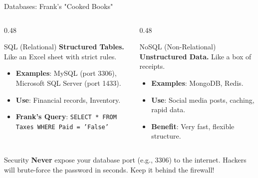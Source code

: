 \documentclass[aspectratio=169]{beamer}  %
\begin{document}
\begin{frame}{Databases: Frank's "Cooked Books"}
    \begin{columns}[T]
        \begin{column}{0.48\textwidth}
            \begin{block}{SQL (Relational)}
                \small
                \textbf{Structured Tables.} Like an Excel sheet with strict rules.
                \begin{itemize}
                    \item \textbf{Examples}: MySQL (port 3306), Microsoft SQL Server (port 1433).
                    \item \textbf{Use}: Financial records, Inventory.
                    \item \textbf{Frank's Query}: \texttt{SELECT * FROM Taxes WHERE Paid = 'False'}
                \end{itemize}
            \end{block}
        \end{column}
        \begin{column}{0.48\textwidth}
            \begin{block}{NoSQL (Non-Relational)}
                \small
                \textbf{Unstructured Data.} Like a box of receipts.
                \begin{itemize}
                    \item \textbf{Examples}: MongoDB, Redis.
                    \item \textbf{Use}: Social media posts, caching, rapid data.
                    \item \textbf{Benefit}: Very fast, flexible structure.
                \end{itemize}
            \end{block}
        \end{column}
    \end{columns}
    \begin{alertblock}{Security}
        \small
        \textbf{Never} expose your database port (e.g., 3306) to the internet. Hackers will brute-force the password in seconds. Keep it behind the firewall!
    \end{alertblock}
\end{frame}
\end{document}
